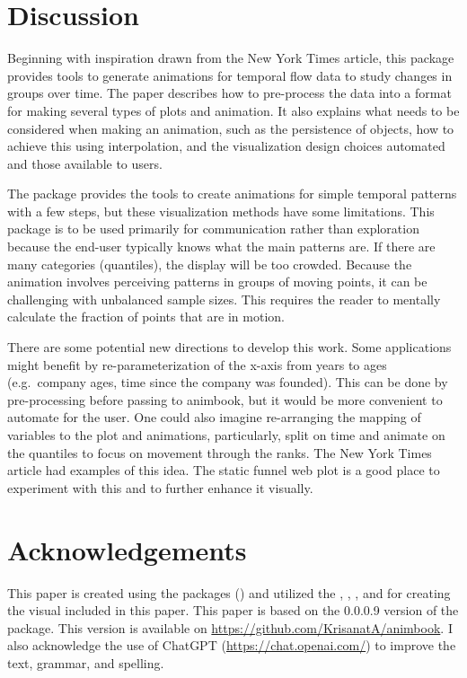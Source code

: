 \section{Discussion}\label{discussion}

Beginning with inspiration drawn from the New York Times article, this package provides tools to generate animations for temporal flow data to study changes in groups over time. The paper describes how to pre-process the data into a format for making several types of plots and animation. It also explains what needs to be considered when making an animation, such as the persistence of objects, how to achieve this using interpolation, and the visualization design choices automated and those available to users.

The package provides the tools to create animations for simple temporal patterns with a few steps, but these visualization methods have some limitations. This package is to be used primarily for communication rather than exploration because the end-user typically knows what the main patterns are. If there are many categories (quantiles), the display will be too crowded. Because the animation involves perceiving patterns in groups of moving points, it can be challenging with unbalanced sample sizes. This requires the reader to mentally calculate the fraction of points that are in motion.

There are some potential new directions to develop this work. Some applications might benefit by re-parameterization of the x-axis from years to ages (e.g.~company ages, time since the company was founded). This can be done by pre-processing before passing to animbook, but it would be more convenient to automate for the user. One could also imagine re-arranging the mapping of variables to the plot and animations, particularly, split on time and animate on the quantiles to focus on movement through the ranks. The New York Times article had examples of this idea. The static funnel web plot is a good place to experiment with this and to further enhance it visually.

\section*{Acknowledgements}\label{acknowledgements}

This paper is created using the  packages (\citet{rjtools}) and utilized the , , , and  for creating the visual included in this paper. This paper is based on the 0.0.0.9 version of the  package. This version is available on \url{https://github.com/KrisanatA/animbook}.
I also acknowledge the use of ChatGPT (\url{https://chat.openai.com/}) to improve the text, grammar, and spelling.

